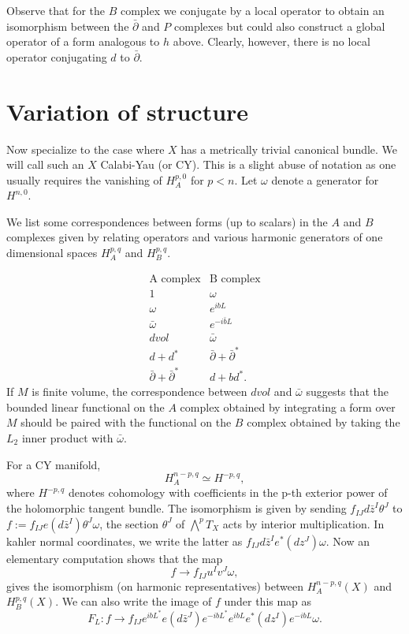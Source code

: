 \documentclass[a4paper,11pt]{amsart}
\newcommand{\db}{\bar{\partial}}
\begin{document}
Observe that for the $B$ complex we conjugate by a local operator to obtain an
isomorphism between the $\db$ and $P$ complexes but 
could also construct a global operator of a form analogous to $h$ above. 
Clearly, however, there is no local operator conjugating $d$ to $\db$. 


\section{Variation of structure}
Now specialize to the case where $X$ has a metrically trivial canonical bundle. 
We will call such an $X$ Calabi-Yau (or CY). This is a slight abuse of notation
as one usually requires the vanishing of $H^{p,0}_A$ for $p<n$. Let $\omega$
denote a generator for $H^{n,0}$. 

We list some correspondences between forms (up to scalars) in the $A$ and $B$
complexes given by relating operators and various harmonic generators of 
one dimensional spaces $H_A^{p,q}$ and $H_B^{p,q}$. 

$$\begin{array}{cc}
\mbox{A complex} & \mbox{B complex}\\
1 & \omega\\
\omega & e^{ibL}\\
\bar\omega & e^{-i\bar b L}\\
dvol & \bar\omega\\
d+d^* & \db+\db^*\\
\db+\db^* & d+bd^*.
\end{array}$$
If $M$ is finite volume, the correspondence between $dvol$ and $\bar\omega$ 
suggests that the bounded linear functional on the $A$ complex obtained by 
integrating a form over $M$ should be paired with the functional on the $B$
complex obtained by taking the $L_2$ inner product with $\bar\omega$. 


For a CY 
manifold, $$H_A^{n-p,q}\simeq H^{-p,q},$$
where $H^{-p,q}$ denotes cohomology with coefficients in the p-th exterior 
power of the holomorphic tangent bundle. The isomorphism is given by 
sending $f_{IJ}d\bar{z}^I\theta^J$ to 
$f:=f_{IJ}e(d\bar{z}^I)\theta^J\omega$, the section 
$\theta^J$ of $\bigwedge^pT_X$ acts by interior multiplication. 
In kahler normal coordinates, we write the latter as 
$f_{IJ}d\bar{z}^Ie^*(dz^J)\omega$.  Now an elementary computation shows 
that the map
$$f\rightarrow f_{IJ}u^Iv^J\omega,$$
gives the isomorphism (on harmonic representatives) between 
$H^{n-p,q}_A(X)$ and $H^{p,q}_B(X).$ We can also write the image of $f$ under 
this map as 
$$F_L:f\rightarrow
f_{IJ}e^{ibL^*}e(d\bar{z}^J)e^{-ibL^*}e^{ibL}e^*(dz^I)e^{-ibL}\omega.$$ 
\end{document}
